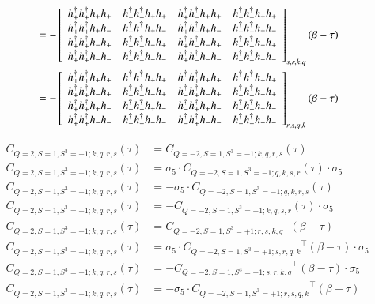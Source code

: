 \begin{equation*}
\begin{aligned}
    &= - \left[ 
    {\begin{array}{cccc}
      \hdcor{+}{+}{+}{+} & \hdcor{+}{+}{+}{-} & \hdcor{+}{+}{-}{+} & \hdcor{+}{+}{-}{-} \\
      \hdcor{-}{+}{+}{+} & \hdcor{-}{+}{+}{-} & \hdcor{-}{+}{-}{+} & \hdcor{-}{+}{-}{-} \\
      \hdcor{+}{-}{+}{+} & \hdcor{+}{-}{+}{-} & \hdcor{+}{-}{-}{+} & \hdcor{+}{-}{-}{-} \\
      \hdcor{-}{-}{+}{+} & \hdcor{-}{-}{+}{-} & \hdcor{-}{-}{-}{+} & \hdcor{-}{-}{-}{-} \\
    \end{array} } \right]_{s,r,k,q} (\beta-\tau) \\
    &= - \left[ 
    {\begin{array}{cccc}
      \hdcor{+}{+}{+}{+} & \hdcor{+}{+}{-}{+} & \hdcor{+}{+}{+}{-} & \hdcor{+}{+}{-}{-} \\
      \hdcor{+}{-}{+}{+} & \hdcor{+}{-}{-}{+} & \hdcor{+}{-}{+}{-} & \hdcor{+}{-}{-}{-} \\
      \hdcor{-}{+}{+}{+} & \hdcor{-}{+}{-}{+} & \hdcor{-}{+}{+}{-} & \hdcor{-}{+}{-}{-} \\
      \hdcor{-}{-}{+}{+} & \hdcor{-}{-}{-}{+} & \hdcor{-}{-}{+}{-} & \hdcor{-}{-}{-}{-} \\
    \end{array} } \right]_{r,s,q,k} (\beta-\tau) \\
  \end{aligned}
\end{equation*}

\begin{equation*}
  \begin{aligned}
    C_{Q=2,S=1,S^3=-1;k,q,r,s} (\tau) &= {C_{Q=-2,S=1,S^3=-1;k,q,r,s}} (\tau) 
    \\
    C_{Q=2,S=1,S^3=-1;k,q,r,s} (\tau) &= \sigma_5\cdot {C_{Q=-2,S=1,S^3=-1;q,k,s,r}} (\tau)\cdot\sigma_5
    \\
    C_{Q=2,S=1,S^3=-1;k,q,r,s} (\tau) &= - \sigma_5\cdot {C_{Q=-2,S=1,S^3=-1;q,k,r,s}} (\tau)
    \\
    C_{Q=2,S=1,S^3=-1;k,q,r,s} (\tau) &= - {C_{Q=-2,S=1,S^3=-1;k,q,s,r}} (\tau)\cdot\sigma_5
    \\
    C_{Q=2,S=1,S^3=-1;k,q,r,s} (\tau) &= {C_{Q=-2,S=1,S^3=+1;r,s,k,q}}^\top (\beta-\tau) 
    \\
    C_{Q=2,S=1,S^3=-1;k,q,r,s} (\tau) &= \sigma_5\cdot {C_{Q=-2,S=1,S^3=+1;s,r,q,k}}^\top (\beta-\tau)\cdot\sigma_5
    \\
    C_{Q=2,S=1,S^3=-1;k,q,r,s} (\tau) &= - {C_{Q=-2,S=1,S^3=+1;s,r,k,q}}^\top (\beta-\tau)\cdot\sigma_5
    \\
    C_{Q=2,S=1,S^3=-1;k,q,r,s} (\tau) &= - \sigma_5\cdot {C_{Q=-2,S=1,S^3=+1;r,s,q,k}}^\top (\beta-\tau)
    \\
  \end{aligned}
\end{equation*}

